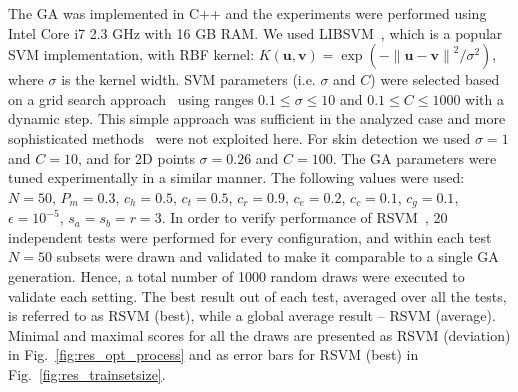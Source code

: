 \documentclass{llncs}
\begin{document}
The GA was implemented in C++ and the experiments were performed using
Intel Core i7 2.3 GHz with 16 GB RAM. We used
LIBSVM~\cite{ChangLin2011}, which is a popular SVM
implementation, with RBF kernel: $K \left( \bm{u}, \bm{v} \right) =
\exp \left( - {\left\| \bm{u} - \bm{v} \right\|^2}/{\sigma^2}
\right)$, where $\sigma$ is the kernel width. SVM parameters (i.e.
$\sigma$ and $C$) were selected based on a grid search
approach~\cite{ChangLin2011} using ranges $0.1\leq\sigma\leq10$ and $0.1\leq C\leq1000$ with a dynamic step. This simple approach was sufficient in the analyzed case and more sophisticated methods~\cite{Staelin2002} were not exploited here. For skin detection we used $\sigma=1$
and $C=10$, and for 2D points $\sigma=0.26$ and $C=100$. The GA
parameters were tuned experimentally in a similar manner. The following values were used:
$N=50$, $P_m=0.3$, $c_{h}=0.5$, $c_{t}=0.5$, $c_{r}=0.9$, $c_{e}=0.2$,
$c_{c}=0.1$, $c_{g}=0.1$, $\epsilon=10^{-5}$, $s_{a}=s_{b}=r=3$. In
order to verify performance of RSVM~\cite{YJLee2007}, 20 independent
tests were performed for every configuration, and within each test
$N=50$ subsets were drawn and validated to make it comparable to a
single GA generation. Hence, a total number of 1000 random draws
were executed to validate each setting. The best result out of each
test, averaged over all the tests, is referred to as RSVM (best),
while a global average result -- RSVM (average). Minimal and maximal
scores for all the draws are presented as RSVM (deviation) in
Fig.~\ref{fig:res_opt_process} and as error bars for RSVM (best) in
Fig.~\ref{fig:res_trainsetsize}.
\end{document}
